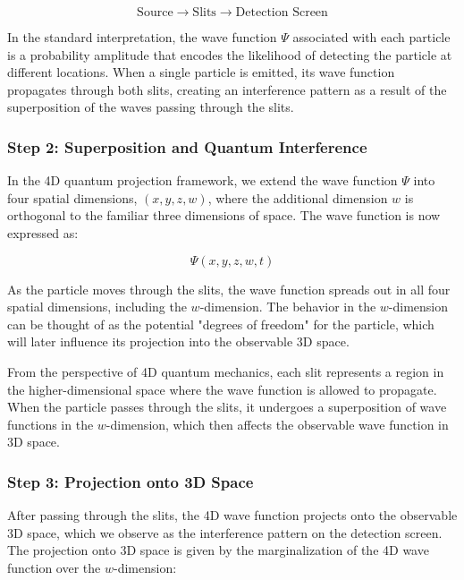 \documentclass[12pt]{article}
\begin{document}
\[
\text{Source} \longrightarrow \text{Slits} \longrightarrow \text{Detection Screen}
\]

In the standard interpretation, the wave function \( \Psi \) associated with each particle is a probability amplitude that encodes the likelihood of detecting the particle at different locations. When a single particle is emitted, its wave function propagates through both slits, creating an interference pattern as a result of the superposition of the waves passing through the slits.

\subsubsection*{Step 2: Superposition and Quantum Interference}

In the 4D quantum projection framework, we extend the wave function \( \Psi \) into four spatial dimensions, \( (x, y, z, w) \), where the additional dimension \( w \) is orthogonal to the familiar three dimensions of space. The wave function is now expressed as:

\begin{equation}
\Psi(x, y, z, w, t)
\end{equation}

As the particle moves through the slits, the wave function spreads out in all four spatial dimensions, including the \( w \)-dimension. The behavior in the \( w \)-dimension can be thought of as the potential "degrees of freedom" for the particle, which will later influence its projection into the observable 3D space.

From the perspective of 4D quantum mechanics, each slit represents a region in the higher-dimensional space where the wave function is allowed to propagate. When the particle passes through the slits, it undergoes a superposition of wave functions in the \( w \)-dimension, which then affects the observable wave function in 3D space.

\subsubsection*{Step 3: Projection onto 3D Space}

After passing through the slits, the 4D wave function projects onto the observable 3D space, which we observe as the interference pattern on the detection screen. The projection onto 3D space is given by the marginalization of the 4D wave function over the \( w \)-dimension:
\end{document}
